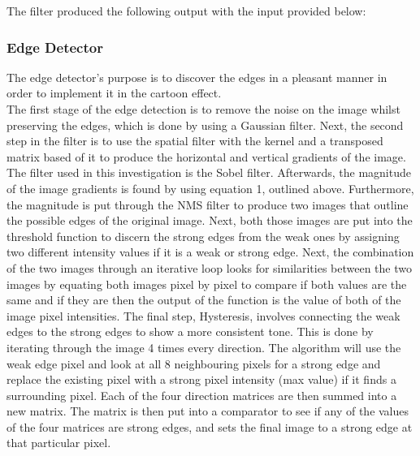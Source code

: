 \documentclass{article}
\begin{document}
	The filter produced the following output with the input provided below:\\
	
%		
	
	\subsubsection{Edge Detector}
	
	The edge detector's purpose is to discover the edges in a pleasant manner in order to implement it in the cartoon effect. \\
	
	The first stage of the edge detection is to remove the noise on the image whilst preserving the edges, which is done by using a Gaussian filter. Next, the second step in the filter is to use the spatial filter with the kernel and a transposed matrix based of it to produce the horizontal and vertical gradients of the image. The filter used in this investigation is the Sobel filter. Afterwards, the magnitude of the image gradients is found by using equation 1, outlined above. Furthermore, the magnitude is put through the NMS filter to produce two images that outline the possible edges of the original image. Next, both those images are put into the threshold function to discern the strong edges from the weak ones by assigning two different intensity values if it is a weak or strong edge. Next, the combination of the two images through an iterative loop looks for similarities between the two images by equating both images pixel by pixel to compare if both values are the same and if they are then the output of the function is the value of both of the image pixel intensities. The final step, Hysteresis, involves connecting the weak edges to the strong edges to show a more consistent tone. This is done by iterating through the image 4 times every direction. The algorithm will use the weak edge pixel and look at all 8 neighbouring pixels for a strong edge and replace the existing pixel with a strong pixel intensity (max value) if it finds a surrounding pixel. Each of the four direction matrices are then summed into a new matrix. The matrix is then put into a comparator to see if any of the values of the four matrices are strong edges, and sets the final image to a strong edge at that particular pixel.\\
	
\end{document}
